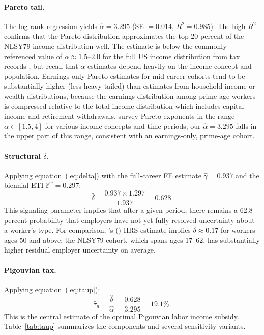 \documentclass[12pt]{article}
\theoremstyle{definition}
\theoremstyle{remark}
\newcommand{\citepos}[1]{\citeauthor{#1}'s (\citeyear{#1})}
\begin{document}
\paragraph{Pareto tail.} The log-rank regression yields $\hat{\alpha} = 3.295$
(SE $= 0.014$, $R^2 = 0.985$). The high $R^2$ confirms that the Pareto distribution
approximates the top 20 percent of the NLSY79 income distribution well. The estimate is
below the commonly referenced value of $\alpha \approx 1.5$--$2.0$ for the full US income
distribution from tax records \citep{saez2001using}, but recall that $\alpha$ estimates
depend heavily on the income concept and population. Earnings-only Pareto estimates for
mid-career cohorts tend to be substantially higher (less heavy-tailed) than estimates from
household income or wealth distributions, because the earnings distribution among prime-age
workers is compressed relative to the total income distribution which includes capital income
and retirement withdrawals. \citet{diamond1998optimal} survey Pareto exponents in the range
$\alpha \in [1.5, 4]$ for various income concepts and time periods; our $\hat{\alpha} = 3.295$
falls in the upper part of this range, consistent with an earnings-only, prime-age cohort.

\paragraph{Structural $\delta$.} Applying equation~(\ref{eq:delta}) with the full-career
FE estimate $\hat{\gamma} = 0.937$ and the biennial ETI $\hat{\varepsilon}^w = 0.297$:
\begin{equation}
\hat{\delta} = \frac{0.937 \times 1.297}{1.937} = 0.628.
\end{equation}
This signaling parameter implies that after a given period, there remains a 62.8 percent
probability that employers have not yet fully resolved uncertainty about a worker's type.
For comparison, \citepos{sztutman2024} HRS estimate implies $\delta \approx 0.17$ for
workers ages 50 and above; the NLSY79 cohort, which spans ages 17--62, has substantially
higher residual employer uncertainty on average.

\paragraph{Pigouvian tax.} Applying equation~(\ref{eq:taup}):
\begin{equation}
\hat{\tau}_p = \frac{\hat{\delta}}{\hat{\alpha}} = \frac{0.628}{3.295} = 19.1\%.
\end{equation}
This is the central estimate of the optimal Pigouvian labor income subsidy. Table~\ref{tab:taup}
summarizes the components and several sensitivity variants.
\end{document}
